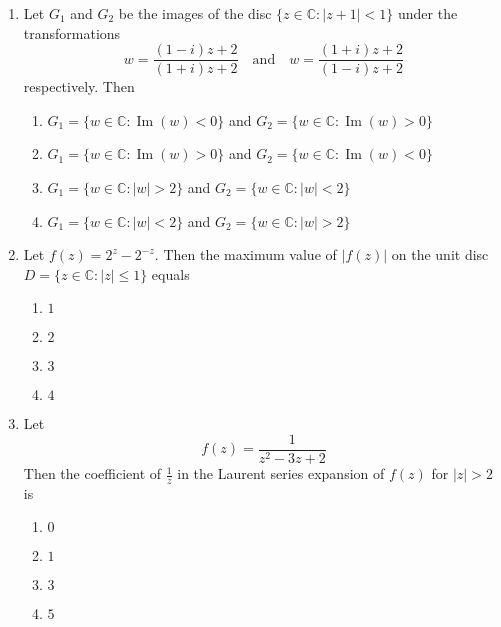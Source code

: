 \documentclass[journal]{IEEEtran}
\numberwithin{equation}{enumi}
\numberwithin{figure}{enumi}
\begin{document}
\begin{enumerate}
\item Let $G_1$ and $G_2$ be the images of the disc $\{ z \in \mathbb{C} : |z + 1| < 1 \}$ under the transformations
\[
w = \frac{(1 - i)z + 2}{(1 + i)z + 2} \quad \text{and} \quad w = \frac{(1 + i)z + 2}{(1 - i)z + 2}
\]
respectively. Then     

\begin{enumerate}
   
  \item $G_1 = \{w \in \mathbb{C} : \operatorname{Im}(w) < 0\}$ and $G_2 = \{w \in \mathbb{C} : \operatorname{Im}(w) > 0\}$
  \item $G_1 = \{w \in \mathbb{C} : \operatorname{Im}(w) > 0\}$ and $G_2 = \{w \in \mathbb{C} : \operatorname{Im}(w) < 0\}$
  \item $G_1 = \{w \in \mathbb{C} : |w| > 2\}$ and $G_2 = \{w \in \mathbb{C} : |w| < 2\}$
  \item $G_1 = \{w \in \mathbb{C} : |w| < 2\}$ and $G_2 = \{w \in \mathbb{C} : |w| > 2\}$

\end{enumerate}



\item Let $f(z) = 2^z - 2^{-z}$. Then the maximum value of $|f(z)|$ on the unit disc $D = \{ z \in \mathbb{C} : |z| \leq 1 \}$ equals      \hfill{}
\begin{multicols}{4}
\begin{enumerate}
    \item $1$
    \item $2$
    \item $3$
    \item $4$
\end{enumerate}
\end{multicols}



\item Let        \hfill{}
\[
f(z) = \frac{1}{z^2 - 3z + 2}
\]
Then the coefficient of $\frac{1}{z}$ in the Laurent series expansion of $f(z)$ for $|z| > 2$ is  
\begin{multicols}{4}
\begin{enumerate}
    \item $0$
    \item $1$
    \item $3$
    \item $5$
\end{enumerate}
\end{multicols}



\end{enumerate}
\end{document}
